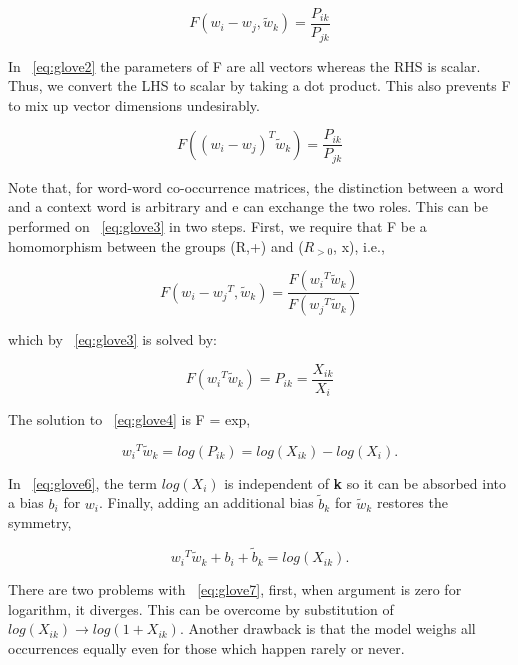 \begin{equation} \label{eq:glove2}
F({w}_{i} - {w}_{j},{\tilde{w}}_{k}) = \frac{{P}_{ik}}{{P}_{jk}}
\end{equation}

In ~\autoref{eq:glove2} the parameters of F are all vectors whereas the RHS is scalar. Thus, we convert the LHS to scalar by taking a dot product. This also prevents F to mix up vector dimensions undesirably.

\begin{equation} \label{eq:glove3}
F({({w}_{i} - {w}_{j})}^{T}{\tilde{w}}_{k}) = \frac{{P}_{ik}}{{P}_{jk}}
\end{equation}

Note that, for word-word co-occurrence matrices, the distinction between a word and a context word is arbitrary and e can exchange the two roles.  This can be performed on  ~\autoref{eq:glove3} in two steps. First, we require that F be a homomorphism
between the groups (R,+) and (${R}_{>0}$, x), i.e., 

\begin{equation} \label{eq:glove4}
F({{w}_{i} - {w}_{j}}^{T},{\tilde{w}}_{k}) = \frac{F({{w}_{i}}^{T} {\tilde{w}}_{k})}{F({{w}_{j}}^{T} {\tilde{w}}_{k})}
\end{equation}

which by ~\autoref{eq:glove3} is solved by:

\begin{equation} \label{eq:glove5}
F({{w}_{i}}^{T} {\tilde{w}}_{k}) = {P}_{ik} = \frac {{X}_{ik}}{{X}_{i}}
\end{equation}

The solution to ~\autoref{eq:glove4} is F = exp,

\begin{equation} \label{eq:glove6}
{{w}_{i}}^{T} {\tilde{w}}_{k}  = log( {P}_{ik} ) = log({X}_{ik} ) - log({X}_{i}) .
\end{equation}

In ~\autoref{eq:glove6}, the term  $log({X}_{i})$ is independent of  \textbf{k} so it can be absorbed into a bias ${b}_{i}$ for  ${w}_{i}$. Finally, adding an additional bias  ${\tilde{b}}_{k}$ for ${\tilde{w}}_{k}$ restores the symmetry,

\begin{equation} \label{eq:glove7}
{{w}_{i}}^{T} {\tilde{w}}_{k} +  {b}_{i} +  {\tilde{b}}_{k} = log({X}_{ik}).
\end{equation}

There are two problems with ~\autoref{eq:glove7}, first, when argument is zero for logarithm, it diverges. This can be overcome by substitution of  $log({X}_{ik})  \rightarrow  log(1 + {X}_{ik})$. Another drawback is that the model weighs all occurrences equally even for those which happen rarely or never. 


